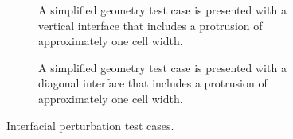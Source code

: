 \begin{figure}[htbp]
\begin{subfigure}{0.3\textwidth}
		\caption{A simplified geometry test case is presented with a vertical interface that includes a protrusion of approximately one cell width.}
		\label{fig:90}
	\end{subfigure}
\hfill
	\begin{subfigure}{0.3\textwidth}
		\caption{A simplified geometry test case is presented with a diagonal interface that includes a protrusion of approximately one cell width.}
		\label{fig:45}
	\end{subfigure}
\caption{Interfacial perturbation test cases.}
\end{figure}

